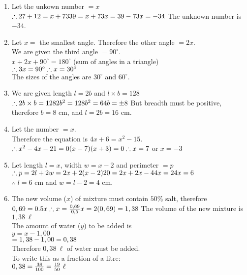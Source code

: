 \begin{solutions}{}
{\begin{enumerate}[itemsep=10pt, label=\textbf{\arabic*}. ]
\item Let the unkown number $=x$\\
$\therefore 27+12=x+73\\
39=x+73\\
x=39-73\\
x=-34\\$
The unknown number is $-34$.
\item Let $x=$ the smallest angle. Therefore the other angle $=2x$. \\
We are given the third angle $=90^{\circ}$. \\
$x+2x+90^{\circ} = 180^{\circ}$ (sum of angles in a triangle)\\
$\therefore 3x = 90^{\circ}\\
\therefore x= 30^{\circ}$\\
The sizes of the angles are $30^{\circ}$ and $60^{\circ}$. 
\item 
We are given length $l=2b$ and $l\times b=128$\\
$\therefore 2b\times b =128\\
2b^2=128\\
b^2=64\\
b=\pm8\\$
But breadth must be positive, \\
therefore $b=8$ cm, and $l=2b=16$ cm.
\item Let the number $=x$. \\
Therefore the equation is $4x+6=x^2-15$.\\
$\therefore x^2-4x-21=0\\
(x-7)(x+3)=0\\
\therefore x=7$ or $x=-3$
\item Let length $l=x$, width $w=x-2$ and perimeter $=p$\\
$\therefore p = 2l+2w\\
=2x+2(x-2)\\
20=2x+2x-4\\
4x=24\\
x=6$\\
$\therefore$ $l=6$ cm and $w=l-2=4$ cm.
\item The new volume ($x$) of mixture must contain $50\%$ salt, therefore\\
$0,69 = 0.5x\\
\therefore x = \frac{0,69 }{0,5}\\
x = 2(0,69) = 1,38\\$
The volume of the new mixture is $1,38~ \ell$\\
The amount of water ($y$) to be added is \\
$y= x-1,00$\\
$= 1,38-1,00\\
=0,38$\\
Therefore $0,38~\ell$ of water must be added.\\
To write this as a fraction of a litre:\\
$0,38 = \frac{38}{100}\\
=\frac{19}{50}~\ell$


\end{enumerate}}
\end{solutions}
